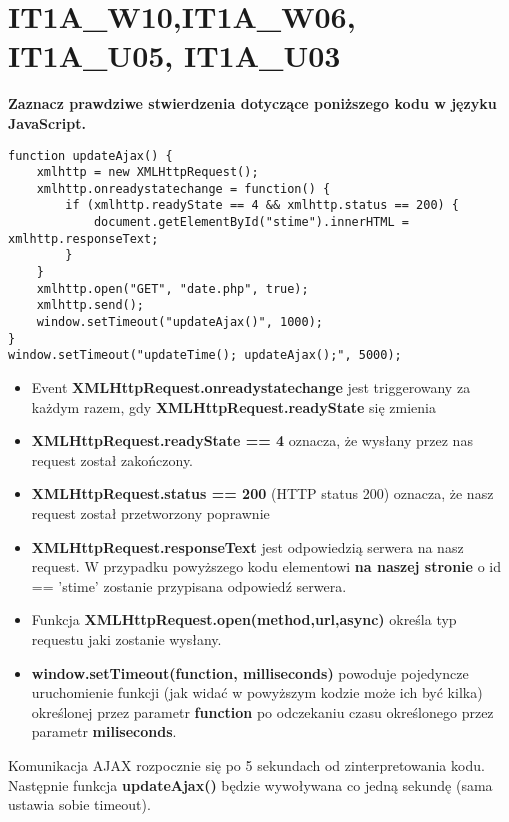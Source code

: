 \vspace{0.4cm}
\noindent


\section{IT1A\_W10,IT1A\_W06, IT1A\_U05, IT1A\_U03}
\textbf{Zaznacz prawdziwe stwierdzenia dotyczące poniższego kodu w języku JavaScript.}


\begin{lstlisting}
function updateAjax() {
    xmlhttp = new XMLHttpRequest();
    xmlhttp.onreadystatechange = function() {
        if (xmlhttp.readyState == 4 && xmlhttp.status == 200) {
            document.getElementById("stime").innerHTML = xmlhttp.responseText;
        }
    }
    xmlhttp.open("GET", "date.php", true);
    xmlhttp.send();
    window.setTimeout("updateAjax()", 1000);
}
window.setTimeout("updateTime(); updateAjax();", 5000);
\end{lstlisting}

\begin{itemize}
\item{Event \textbf{XMLHttpRequest.onreadystatechange} jest triggerowany za każdym razem, gdy
\textbf{XMLHttpRequest.readyState} się zmienia}

\item{\textbf{XMLHttpRequest.readyState == 4} oznacza, że wysłany przez nas request został zakończony.}

\item{\textbf{XMLHttpRequest.status == 200 } (HTTP status 200) oznacza, że nasz request został przetworzony poprawnie}

\item{\textbf{XMLHttpRequest.responseText} jest odpowiedzią serwera na nasz request. W przypadku powyższego kodu elementowi \textbf{na naszej stronie} o id == 'stime' zostanie przypisana odpowiedź serwera.} 

\item{Funkcja \textbf{XMLHttpRequest.open(method,url,async)} określa typ requestu jaki zostanie wysłany. }

\item{\textbf{window.setTimeout(function, milliseconds)} powoduje pojedyncze uruchomienie funkcji (jak widać w powyższym kodzie może ich być kilka) określonej przez parametr \textbf{function} po odczekaniu czasu określonego przez parametr \textbf{miliseconds}.}

\end{itemize}
Komunikacja AJAX rozpocznie się po 5 sekundach od zinterpretowania kodu. Następnie funkcja \textbf{updateAjax()} będzie wywoływana co jedną sekundę (sama ustawia sobie timeout).


